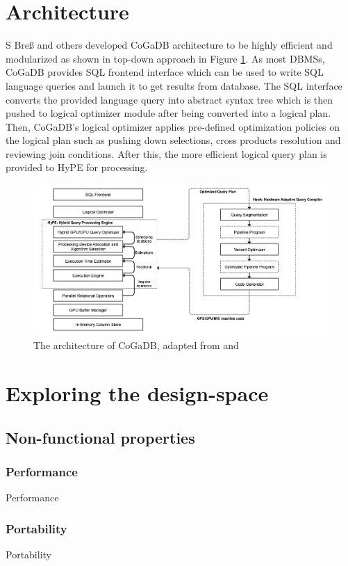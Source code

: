 \documentclass[a4paper, 11pt]{article}
\begin{document}
\section*{Architecture}
S Bre{ß} and others developed CoGaDB architecture to be highly efficient and modularized as shown in top-down approach in Figure \ref{fig:cogadbarch}.
As most DBMSs, CoGaDB provides SQL frontend interface which can be used to write SQL language queries and launch it to get results from database. The SQL interface converts the provided language query into abstract syntax tree which is then pushed to logical optimizer module after being converted into a logical plan. Then, CoGaDB's logical optimizer applies pre-defined optimization policies on the logical plan such as pushing down selections, cross products resolution and reviewing join conditions. After this, the more efficient logical query plan is provided to HyPE for processing.
\begin{figure}
\includegraphics[width=\textwidth]{cogadb_hawk_architecture}
\caption{The architecture of CoGaDB, adapted from \cite{cogadb_hawk} and \cite{cogadb_manual}}
\label{fig:cogadbarch}
\end{figure}


\section*{Exploring the design-space}
\subsection*{Non-functional properties}
\subsubsection*{Performance}
Performance

\subsubsection*{Portability}
Portability
\end{document}
